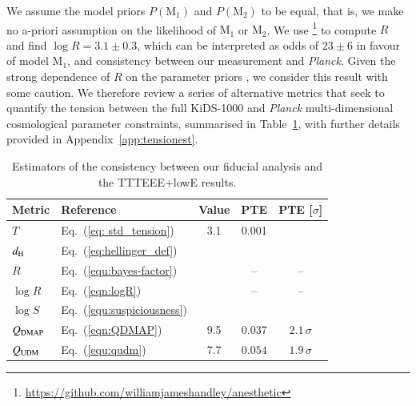We assume the model priors $P(\mathrm{M}_1)$ and $P(\mathrm{M}_2)$ to be equal, that is, we make no a-priori assumption on the likelihood of $\mathrm{M}_1$ or $\mathrm{M}_2$. 
We use \footnote{\url{https://github.com/williamjameshandley/anesthetic}}\citep{anesthetic} to compute $R$ and find $\log R=3.1\pm0.3$, which can be interpreted as odds of $23\pm6$ in favour of model $\mathrm{M}_1$, and consistency between our \tttp measurement and {\it Planck}.  Given the strong dependence of $R$ on the parameter priors \citet{handley/lemos:2019}, we consider this result with some caution.  We therefore review a series of alternative metrics that seek to quantify the tension between the full KiDS-1000 and {\it Planck} multi-dimensional cosmological parameter constraints, summarised in Table~\ref{tab:tension}, with further details provided in Appendix~\ref{app:tensionest}.

\begin{table}
	\begin{center}
		\caption{Estimators of the consistency between our fiducial \tttp analysis and the \citet{planck/etal:2018} TTTEEE+lowE results. }
		\label{tab:tension}
\begin{tabular}{llccc}
    \toprule
   Metric   & Reference          & Value &PTE   & PTE [$\sigma$]\\
    \midrule
	$T$ & Eq.~(\ref{eq: std_tension})    & 3.1 & 0.001 & \kpoff  \\
	$d_{\rm H}$ & Eq.~(\ref{eq:hellinger_def})& & &\\
    \midrule
	$R$   &  Eq.~(\ref{equ:bayes-factor}) & \kR & -- & -- \\
	$\log R$  & Eq.~(\ref{eqn:logR}) &  \klogR& -- & --\\
	$\log S$  &  Eq.~(\ref{equ:suspiciousness})  & \klogS & \klogSPTE &\klogSPTEsigma \\
	$Q_{\rm DMAP}$  & Eq.~(\ref{eqn:QDMAP})  & 9.5 & 0.037 & $2.1\, \sigma$\\
	$Q_{\rm UDM}$ &  Eq.~(\ref{equ:qudm})  & 7.7 & $0.054$  &$1.9\,\sigma$ \\
    \bottomrule
\end{tabular}
	\end{center}
\end{table}

